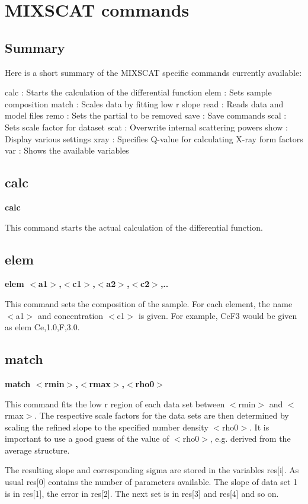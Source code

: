 \chapter{MIXSCAT commands}
\section{Summary}
Here is a short summary of the MIXSCAT specific commands currently 
available: 
\par
\begin{MacVerbatim}
calc    : Starts the calculation of the differential function
elem    : Sets sample composition
match   : Scales data by fitting low r slope
read    : Reads data and model files
remo    : Sets the partial to be removed
save    : Save commands
scal    : Sets scale factor for dataset
scat    : Overwrite internal scattering powers
show    : Display various settings
xray    : Specifies Q-value for calculating X-ray form factors
var     : Shows the available variables
\end{MacVerbatim}
\section{calc}
{\bf calc \par }
\par
\vspace{3pt}
This command starts the actual calculation of the differential 
function. 
\section{elem}
{\bf elem $ <$a1$> $,$ <$c1$> $,$ <$a2$> $,$ <$c2$> $,.. \par }
\par
\vspace{3pt}
This command sets the composition of the sample. For each element, 
the name $ <$a1$> $ and concentration $ <$c1$> $ is given. For example, CeF3 
would be given as elem Ce,1.0,F,3.0. 
\section{match}
{\bf match $ <$rmin$> $,$ <$rmax$> $,$ <$rho0$> $ \par }
\par
\vspace{3pt}
This command fits the low r region of each data set between $ <$rmin$> $ 
and $ <$rmax$> $. The respective scale factors for the data sets are 
then determined by scaling the refined slope to the specified 
number density $ <$rho0$> $. It is important to use a good guess of the 
value of $ <$rho0$> $, e.g. derived from the average structure. 
\par
The resulting slope and corresponding sigma are stored in the 
variables res[i]. As usual res[0] contains the number of parameters 
available. The slope of data set 1 is in res[1], the error in res[2]. 
The next set is in res[3] and res[4] and so on. 
